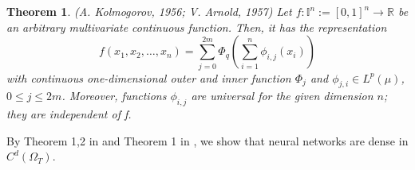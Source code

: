 \documentclass{article}
\newtheorem{theorem}{Theorem}[section]
\begin{document}

\begin{theorem}
	 (\textit{A. Kolmogorov, 1956; V. Arnold, 1957}) Let $f : \mathbb{I}^{n} := [0,1]^{n} \rightarrow\mathbb{R}$ be an arbitrary multivariate continuous function. Then, it has the representation
	 \begin{equation}
	 f(x_1,x_2, \dots, x_n)=\sum_{j=0}^{2m}\Phi_{q}\left(\sum_{i=1}^{n}\phi_{i,j}(x_i)\right)
	 \label{eq:komo}
	 \end{equation}
	 with continuous one-dimensional outer and inner function $\Phi_{j}$ and $\phi_{j,i}\in L^p(\mu)$, $0\le j\le 2m$.
Moreover, functions $\phi_{i,j}$ are universal for the given dimension $n$; they are independent of f.
	\end{theorem}
By Theorem 1,2 in \cite{hornik} and Theorem 1 in \cite{cybenko}, we show that neural networks are dense in $C^{d}(\Omega_{T})$.
\end{document}
